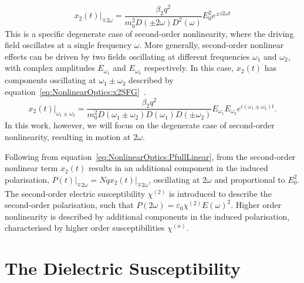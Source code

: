 \begin{equation}
	x_{2}(t)\vert_{\mp 2\omega} = \frac{\beta_2 q^2}{m_{0}^2 D(\pm 2\omega) D^{2}(\omega)} E_0^2 e^{\pm i 2\omega t}
\end{equation}
This is a specific degenerate case of second-order nonlinearity, where the driving field oscillates at a single frequency $\omega$. More generally, second-order nonlinear effects can be driven by two fields oscillating at different frequencies $\omega_1$ and $\omega_2$, with complex amplitudes $E_{\omega_1}$ and  $E_{\omega_2}$ respectively. In this case, $x_{2}(t)$ has components oscillating at $\omega_1 \pm \omega_2$ described by equation~\ref{eq:NonlinearOptics:x2SFG}~\cite[\S 1.4.1]{Boyd2008a}.
\begin{equation}\label{eq:NonlinearOptics:x2SFG}
	x_{2}(t)\vert_{\omega_1 \pm \omega_2} = \frac{\beta_2 q^2}{m_{0}^2 D(\omega_1 \pm \omega_2) D(\omega_1) D(\pm\omega_2)} E_{\omega_1} E_{\omega_2} e^{i (\omega_1 \pm \omega_2) t}.
\end{equation}
In this work, however, we will focus on the degenerate case of second-order nonlinearity, resulting in motion at $2\omega$.

Following from equation~\ref{eq:NonlinearOptics:PfullLinear}, from  the second-order nonlinear term $x_{2}(t)$ results in an additional component in the induced polarisation, $P(t)\vert_{\mp 2\omega} = N q x_{2}(t)\vert_{\mp 2\omega}$, oscillating at $2\omega$ and proportional to $E_0^2$. The second-order electric susceptibility $\chi^{(2)}$ is introduced to describe the second-order polarisation, such that $P(2\omega) = \varepsilon_0 \chi^{(2)} E(\omega)^2$. Higher order nonlinearity is described by additional components in the induced polarisation, characterised by higher order susceptibilities $\chi^{(n)}$.

\section{The Dielectric Susceptibility}\label{sec:background:NonlinearOptics:susceptibility}

